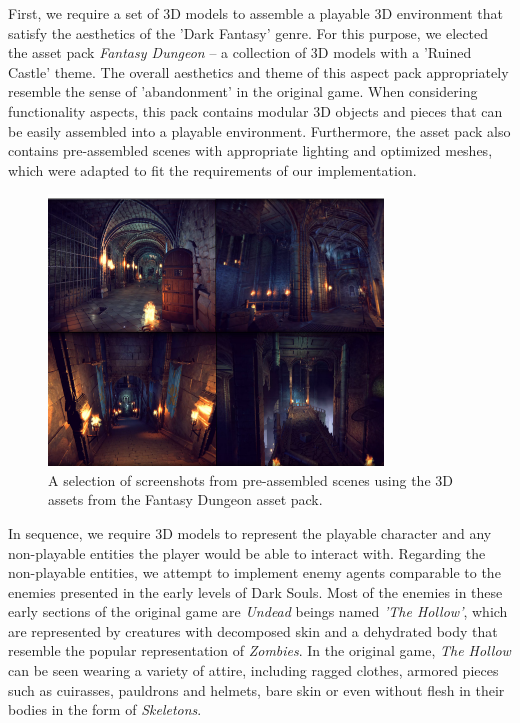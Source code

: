 First, we require a set of 3D models to assemble a playable 3D environment that satisfy the aesthetics of the 'Dark Fantasy' genre. For this purpose, we elected the asset pack \emph{Fantasy Dungeon} -- a collection of 3D models with a 'Ruined Castle' theme. The overall aesthetics and theme of this aspect pack appropriately resemble the sense of 'abandonment' in the original game. When considering functionality aspects, this pack contains modular 3D objects and pieces that can be easily assembled into a playable environment. Furthermore, the asset pack also contains pre-assembled scenes with appropriate lighting and optimized meshes, which were adapted to fit the requirements of our implementation.

\begin{figure}
    \caption{A selection of screenshots from pre-assembled scenes using the 3D assets from the Fantasy Dungeon asset pack.}
    \begin{center}
        \includegraphics[width=24em]{figures/fig-environment-assets.png}
    \end{center}
    \label{fig:environment-assets}
\end{figure}


In sequence, we require 3D models to represent the playable character and any non-playable entities the player would be able to interact with. Regarding the non-playable entities, we attempt to implement enemy agents comparable to the enemies presented in the early levels of Dark Souls. Most of the enemies in these early sections of the original game are \emph{Undead} beings named \emph{'The Hollow'}, which are represented by creatures with decomposed skin and a dehydrated body that resemble the popular representation of \emph{Zombies}. In the original game, \emph{The Hollow} can be seen wearing a variety of attire, including ragged clothes, armored pieces such as cuirasses, pauldrons and helmets, bare skin or even without flesh in their bodies in the form of \emph{Skeletons}.

